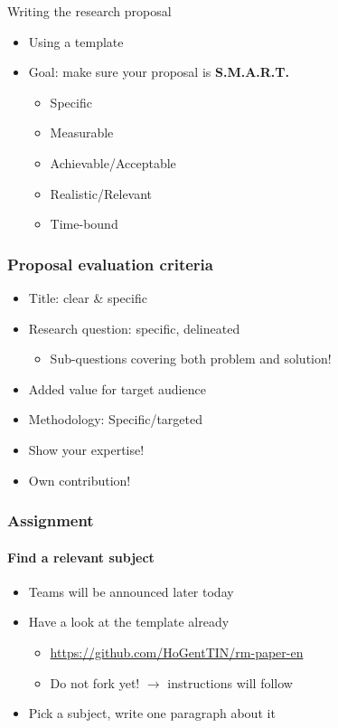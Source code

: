 \documentclass[aspectratio=169]{beamer}
\begin{document}
    \begin{frame}{Writing the research proposal}
        
        \begin{itemize}
            \item Using a template
            \item Goal: make sure your proposal is \textbf{S.M.A.R.T.}
            \begin{itemize}
                \item Specific
                \item Measurable
                \item Achievable/Acceptable
                \item Realistic/Relevant
                \item Time-bound
            \end{itemize}
        \end{itemize}
    \end{frame}
    
    \begin{frame}
        \frametitle{Proposal evaluation criteria}
        
        \begin{itemize}
            \item Title: clear \& specific
            \item Research question: specific, delineated
            \begin{itemize}
                \item  Sub-questions covering both problem and solution!
            \end{itemize} 
            \item Added value for target audience
            \item Methodology: Specific/targeted
            \item Show your expertise!
            \item Own contribution!
        \end{itemize}
        
    \end{frame}
        
    \begin{frame}
        \frametitle{Assignment}
        \framesubtitle{Find a relevant subject}
        
        \begin{itemize}
            \item Teams will be announced later today
            \item Have a look at the template already
            \begin{itemize}
                \item \url{https://github.com/HoGentTIN/rm-paper-en}
                \item Do not fork yet! $\rightarrow$ instructions will follow
            \end{itemize}
            \item Pick a subject, write one paragraph about it
        \end{itemize}
        
    \end{frame}
    
\end{document}
